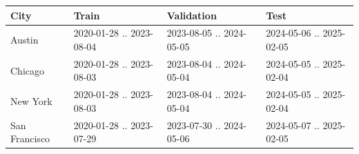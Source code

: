 \begin{tabular}{llll}
\toprule
City & Train & Validation & Test \\
\midrule
Austin & 2020-01-28 .. 2023-08-04 & 2023-08-05 .. 2024-05-05 & 2024-05-06 .. 2025-02-05 \\
Chicago & 2020-01-28 .. 2023-08-03 & 2023-08-04 .. 2024-05-04 & 2024-05-05 .. 2025-02-04 \\
New York & 2020-01-28 .. 2023-08-03 & 2023-08-04 .. 2024-05-04 & 2024-05-05 .. 2025-02-04 \\
San Francisco & 2020-01-28 .. 2023-07-29 & 2023-07-30 .. 2024-05-06 & 2024-05-07 .. 2025-02-05 \\
\bottomrule
\end{tabular}
